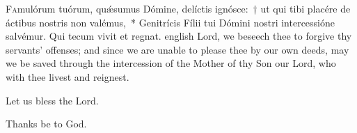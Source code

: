 \documentclass[12pt]{book}
\begin{document}

\texteparacol
{\lettrine{F}{a}mulórum tuórum, quǽsumus Dómine, delí\-ctis ignósce:~† ut qui tibi placére de á\-ctibus nostris non valémus,~* Genitrícis Fílii tui Dómini nostri intercessióne salvémur. Qui tecum vivit et regnat.}
{english}
{\noindent Lord, we beseech thee to forgive thy servants' offenses; and since we are unable to please thee by our own deeds, may we be saved through the intercession of the Mother of thy Son our Lord, who with thee livest and reignest.}

\myrule






\myrule




\noindent \vv Let us bless the Lord.

\noindent \rr Thanks be to God.



\end{document}
